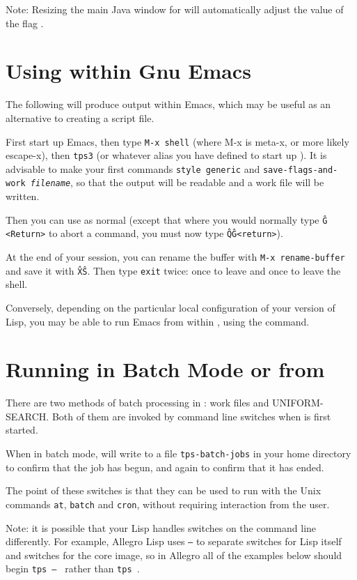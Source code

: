 Note: Resizing the main Java window for {\TPS} will automatically
adjust the value of the flag .

\section{Using {\TPS} within Gnu Emacs}

The following will produce output within Emacs, which may be useful as an
alternative to creating a script file.

First start up Emacs, then type {\tt M-x shell} (where M-x is meta-x, or more
likely escape-x), then {\tt tps3} (or whatever alias you have defined to start
up {\TPS}). It is advisable to make your first commands {\tt style generic} and
{\tt save-flags-and-work {\it filename}}, so that the output will be readable
and a work file will be written.

Then you can use {\TPS} as normal (except that where you would normally type
{\tt \^G <Return>} to abort a command, you must now type {\tt \^Q\^G<return>}).

At the end of your session, you can rename the buffer with {\tt M-x rename-buffer}
and save it with {\tt \^X\^S}. Then type {\tt exit} twice: once to leave {\TPS} and once
to leave the shell.

Conversely, depending on the particular local configuration of your
version of Lisp, you may be able to run Emacs from within {\TPS}, using
the  command.


\section{Running {\TPS} in Batch Mode or from }

There are two methods of batch processing in {\TPS}: work files and UNIFORM-SEARCH. Both of them are invoked
by command line switches when {\TPS} is first started.

When in batch mode, {\TPS} will write to a file {\tt tps-batch-jobs} in your home directory
to confirm that the job has begun, and again to confirm that it has ended.

The point of these switches is that they can be used to run {\TPS} with the Unix commands {\tt at}, {\tt batch} and {\tt cron},
without requiring interaction from the user.

Note: it is possible that your Lisp handles switches on the command line differently. For example, Allegro Lisp uses {\tt --}
to separate switches for Lisp itself and switches for the core image, so in Allegro all of the examples below should begin
{\tt tps -- } rather than {\tt tps }.

